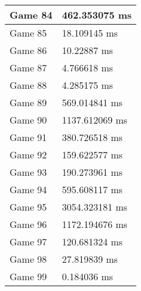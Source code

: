 \begin{tabular}{|l|l|}
	Game 84 & 462.353075 ms \\ \hline
	Game 85 & 18.109145 ms \\ \hline
	Game 86 & 10.22887 ms \\ \hline
	Game 87 & 4.766618 ms \\ \hline
	Game 88 & 4.285175 ms \\ \hline
	Game 89 & 569.014841 ms \\ \hline
	Game 90 & 1137.612069 ms \\ \hline
	Game 91 & 380.726518 ms \\ \hline
	Game 92 & 159.622577 ms \\ \hline
	Game 93 & 190.273961 ms \\ \hline
	Game 94 & 595.608117 ms \\ \hline
	Game 95 & 3054.323181 ms \\ \hline
	Game 96 & 1172.194676 ms \\ \hline
	Game 97 & 120.681324 ms \\ \hline
	Game 98 & 27.819839 ms \\ \hline
	Game 99 & 0.184036 ms \\ \hline
\end{tabular}
